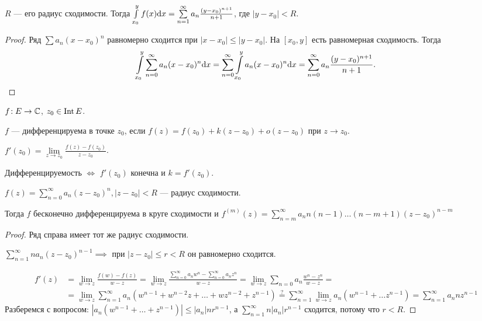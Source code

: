 \begin{theorem}[о почленном интегрировании степенного ряда $\sum\limits_{n=0}^\infty a_n(x-x_0)^n = f(x)$]
    $R$ --- его радиус сходимости. Тогда  $\int\limits_{x_0}^y f(x)\mathrm{d}x = \sum\limits_{n=1}^\infty a_n \frac{(y-x_0)^{n+1}}{n+1}$, где $|y-x_0| < R$.
\end{theorem}
\begin{proof}
    Ряд $\sum a_n(x-x_0)^n$ равномерно сходится при $|x-x_0| \le |y-x_0|$. На $[x_0, y]$ есть равномерная сходимость. Тогда
\begin{align*}
    \int\limits_{x_0}^y \sum\limits_{n=0}^\infty a_n(x-x_0)^n \mathrm{d}x = \sum\limits_{n=0}^\infty \int\limits_{x_0}^y a_n(x-x_0)^n \mathrm{d}x = \sum\limits_{n=0}^\infty a_n \frac{(y-x_0)^{n+1}}{n+1}.
\end{align*}
\end{proof}
\begin{definition}
    $f\!: E \to \mathbb{C}$,  $z_0 \in \operatorname{Int} E$.

    $f$ --- дифференцируема в точке  $z_0$, если $f(z) = f(z_0) + k(z-z_0) + o(z-z_0)$  при $z \to z_0$.
\end{definition}
\begin{definition}
    $f'(z_0) = \lim\limits_{z \to z_0} \frac{f(z) - f(z_0)}{z - z_0}$.
\end{definition}
\begin{remark}
    Дифференцируемость $\iff$ $f'(z_0)$ конечна и $k = f'(z_0)$.
\end{remark}
\begin{theorem}
    $f(z) = \sum\limits_{n=0}^\infty a_n(z-z_0)^n, |z-z_0| < R$ --- радиус сходимости.

    Тогда $f$ бесконечно дифференцируема в круге сходимости и  $f^{(m)}(z) = \sum\limits_{n=m}^\infty a_n n (n-1) \ldots (n - m + 1)(z-z_0)^{n-m}$
\end{theorem}
\begin{proof}
    Ряд справа имеет тот же радиус сходимости.

    $\sum\limits_{n=1}^\infty na_n(z - z_0)^{n-1} \implies$ при $|z-z_0| \le r < R$ он равномерно сходится.

    \begin{align*}
        f'(z) &= \lim\limits_{w \to z} \frac{f(w) - f(z)}{w - z} = \lim\limits_{w \to z} \frac{\sum\limits_{n=0}^\infty a_nw^n - \sum\limits_{n=0}^\infty a_nz^n}{w - z} = \lim\limits_{w \to z} \sum\limits_{n=0}a_n \frac{w^n - z^n}{w - z}  = \\
              &= \lim\limits_{w \to z} \sum\limits_{n=1}^\infty a_n(w^{n-1} + w^{n-2}z + \ldots + wz^{n-2} + z^{n-1}) \overset{?}{=} \sum\limits_{n=1}^\infty \lim\limits_{w \to z} a_n(w^{n-1} + \ldots z^{n-1}) = \sum\limits_{n=1}^\infty a_n n z^{n-1}
\end{align*}
Разберемся с вопросом: $|a_n(w^{n-1} + \ldots + z^{n-1})| \le |a_n| n r^{n-1}$, а $\sum\limits_{n=1}^\infty n|a_n| r^{n-1}$ сходится, потому что $r < R$.
\end{proof}

